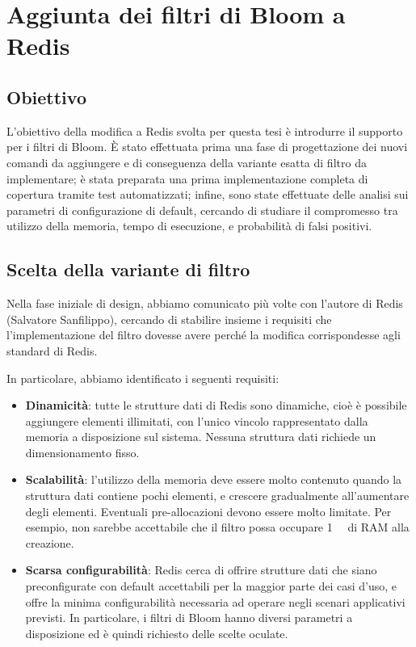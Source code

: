 \chapter{Aggiunta dei filtri di Bloom a Redis}

\section{Obiettivo}

L'obiettivo della modifica a Redis svolta per questa tesi è introdurre il supporto per i filtri di
Bloom. È stato effettuata prima una fase di progettazione dei nuovi comandi da aggiungere e di
conseguenza della variante esatta di filtro da implementare; è stata preparata una prima
implementazione completa di copertura tramite test automatizzati; infine, sono state effettuate
delle analisi sui parametri di configurazione di default, cercando di studiare il compromesso tra
utilizzo della memoria, tempo di esecuzione, e probabilità di falsi positivi.

\section{Scelta della variante di filtro}

Nella fase iniziale di design, abbiamo comunicato più volte con l'autore di Redis (Salvatore
Sanfilippo), cercando di stabilire insieme i requisiti che l'implementazione del filtro dovesse
avere perché la modifica corrispondesse agli standard di Redis.

In particolare, abbiamo identificato i seguenti requisiti:

\begin{itemize}
	\medskip
	\item \textbf{Dinamicità}: tutte le strutture dati di Redis sono dinamiche, cioè è possibile
	aggiungere elementi illimitati, con l'unico vincolo rappresentato dalla memoria a disposizione
	sul sistema. Nessuna struttura dati richiede un dimensionamento fisso.

	\item \textbf{Scalabilità}: l'utilizzo della memoria deve essere molto contenuto quando la
	struttura dati contiene pochi elementi, e crescere gradualmente all'aumentare degli elementi.
	Eventuali pre-allocazioni devono essere molto limitate. Per esempio, non sarebbe accettabile che
	il filtro possa occupare \SI{1}{\mega\byte} di RAM alla creazione.

	\item \textbf{Scarsa configurabilità}: Redis cerca di offrire strutture dati che siano
	preconfigurate con default accettabili per la maggior parte dei casi d'uso, e offre la minima
	configurabilità necessaria ad operare negli scenari applicativi previsti. In particolare,
	i filtri di Bloom hanno diversi parametri a disposizione ed è quindi richiesto delle scelte
	oculate.
\end{itemize}

